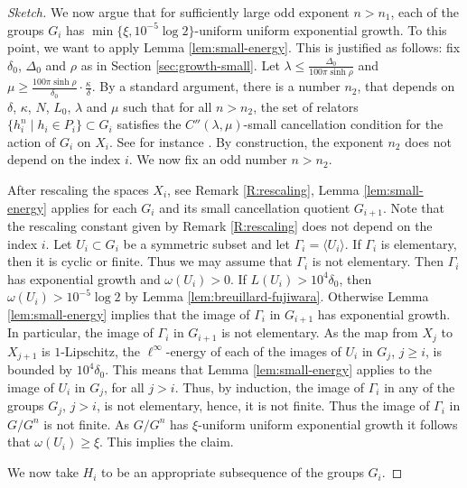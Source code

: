 \documentclass[leqno,a4paper,10pt]{amsart}
\theoremstyle{plain}
\theoremstyle{definition}
\theoremstyle{remark}
\DeclareMathOperator{\diam}{diam}
\let\le\leqslant
\let\ge\geqslant
\begin{document}
\begin{proof}[Sketch]
We now argue that for sufficiently large odd exponent $n>n_1$, each of the groups $G_i$ has $\min\{\xi,10^{-5}\log 2\}$-uniform uniform exponential growth. To this point, we want to apply Lemma \ref{lem:small-energy}. This is justified as follows: fix $\delta_0$, $\Delta_0$ and $\rho$ as in Section \ref{sec:growth-small}. Let $\lambda\le \frac{\Delta_0}{100\pi\sinh\rho}$  and $ \mu\ge \frac{100\pi \sinh \rho}{\delta_0}\cdot \frac{\kappa}{\delta}.$ By a standard argument, there is a number $n_2$, that depends on $\delta$, $\kappa$, $N$, $L_0$, $\lambda$ and $\mu$ such that for all $n>n_2$, the set of relators $\{ h_i^n \mid h_i\in P_i\}\subset G_i$ satisfies the $C''(\lambda,\mu)$-small cancellation condition for the action of $G_i$ on $X_i$. See for instance \cite[Proposition 6.29 and Remark 6.30]{dahmani_hyperbolically_2017}. %
By construction, the exponent $n_2$ does not depend on the index $i$. We now fix an odd number $n>n_2$. 

After rescaling the spaces $X_i$, see Remark \ref{R:rescaling}, Lemma \ref{lem:small-energy} applies for each $G_i$ and its small cancellation quotient $G_{i+1}$. Note that the rescaling constant given by Remark \ref{R:rescaling} does not depend on the index $i$. 
  Let $U_i\subset G_i$ be a symmetric subset and let $\Gamma_i=\langle U_i \rangle$. If $\Gamma_i$ is elementary, then it is cyclic or finite. Thus we may assume that $\Gamma_i$ is not elementary. Then $\Gamma_i$ has exponential growth and $\omega(U_i)>0$.  If $L(U_i)>10^4\delta_0$, then $\omega(U_i)>10^{-5}\log 2$ by Lemma \ref{lem:breuillard-fujiwara}. Otherwise Lemma \ref{lem:small-energy} implies that the image of $\Gamma_i$ in $G_{i+1}$ has exponential growth. In particular, the image of $\Gamma_i$ in $G_{i+1}$ is not elementary. As the map from $X_j$ to $X_{j+1}$ is $1$-Lipschitz, the $\ell^{\infty}$-energy of each of the images of $U_i$ in $G_j$, $j\geqslant i$, is bounded by $10^4\delta_0$. This means that Lemma \ref{lem:small-energy} applies to the image of $U_i$ in $G_j$, for all $j>i$. Thus, by induction, the image of $\Gamma_i$ in any of the groups $G_j$, $j>i$, is not elementary, hence, it is not finite. Thus the image of $\Gamma_i$ in $G/G^n$ is not finite. As $G/G^n$ has $\xi$-uniform uniform exponential growth it follows that $\omega(U_i)\geqslant \xi$. This implies the claim. 
  
    We now take $H_i$ to be an appropriate subsequence of the groups $G_i$. 
 \end{proof}
 
\end{document}
